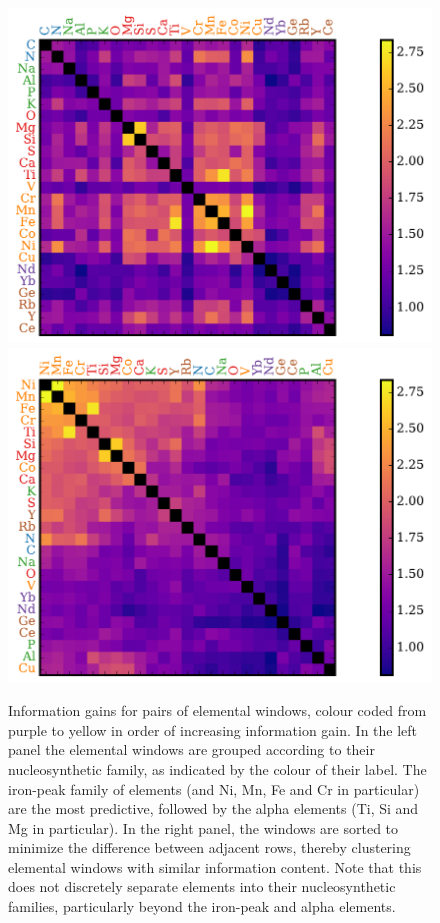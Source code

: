 \documentclass[a4paper,fleqn,usenatbib]{mnras}
\begin{document}
\begin{figure}
	\includegraphics[width=\columnwidth]{apogee_centers_final_29502_spc_iw_prior_win_wid_1p5_sorted_inf_gains_fam_z.pdf}
	\includegraphics[width=\columnwidth]{apogee_centers_final_29502_spc_iw_prior_win_wid_1p5_sorted_inf_gains_abs_min_tot_dist.pdf}
    \caption{Information gains for pairs of elemental windows, colour coded from purple to yellow in order of increasing information gain. In the left panel the elemental windows are grouped according to their nucleosynthetic family, as indicated by the colour of their label. The iron-peak family of elements (and Ni, Mn, Fe and Cr in particular) are the most predictive, followed by the alpha elements (Ti, Si and Mg in particular). In the right panel, the windows are sorted to minimize the difference between adjacent rows, thereby clustering elemental windows with similar information content. Note that this does not discretely separate elements into their nucleosynthetic families, particularly beyond the iron-peak and alpha elements.}
    \label{fig:all_element_information}
\end{figure}
\end{document}
